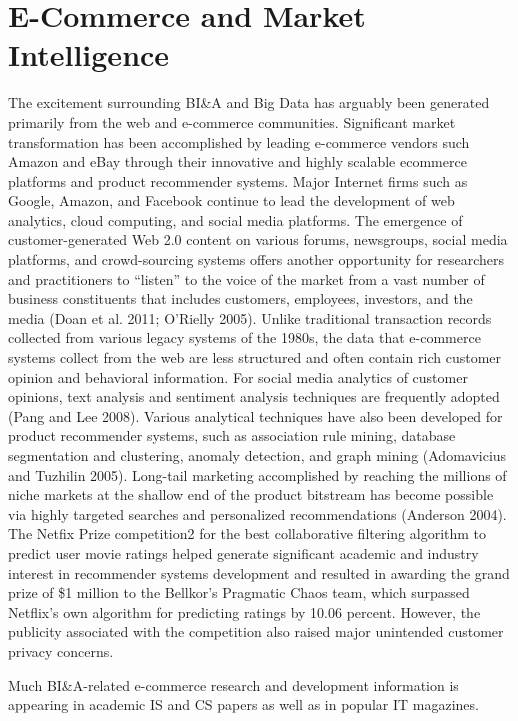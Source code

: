 \section{E-Commerce and Market Intelligence}

The excitement surrounding BI\&A and Big Data has arguably
been generated primarily from the web and e-commerce
communities. Significant market transformation has been
accomplished by leading e-commerce vendors such Amazon
and eBay through their innovative and highly scalable ecommerce
platforms and product recommender systems.
Major Internet firms such as Google, Amazon, and Facebook
continue to lead the development of web analytics, cloud
computing, and social media platforms. The emergence of
customer-generated Web 2.0 content on various forums,
newsgroups, social media platforms, and crowd-sourcing
systems offers another opportunity for researchers and practitioners to “listen” to the voice of the market from a vast
number of business constituents that includes customers, employees,
investors, and the media (Doan et al. 2011; O’Rielly
2005). Unlike traditional transaction records collected from
various legacy systems of the 1980s, the data that e-commerce
systems collect from the web are less structured and often
contain rich customer opinion and behavioral information.
For social media analytics of customer opinions, text analysis
and sentiment analysis techniques are frequently adopted
(Pang and Lee 2008). Various analytical techniques have also
been developed for product recommender systems, such as
association rule mining, database segmentation and clustering,
anomaly detection, and graph mining (Adomavicius and
Tuzhilin 2005). Long-tail marketing accomplished by
reaching the millions of niche markets at the shallow end of
the product bitstream has become possible via highly targeted
searches and personalized recommendations (Anderson
2004).
The Netfix Prize competition2
for the best collaborative
filtering algorithm to predict user movie ratings helped generate
significant academic and industry interest in recommender
systems development and resulted in awarding the grand prize
of \$1 million to the Bellkor’s Pragmatic Chaos team, which
surpassed Netflix’s own algorithm for predicting ratings by
10.06 percent. However, the publicity associated with the
competition also raised major unintended customer privacy
concerns.

Much BI\&A-related e-commerce research and development
information is appearing in academic IS and CS papers as
well as in popular IT magazines.